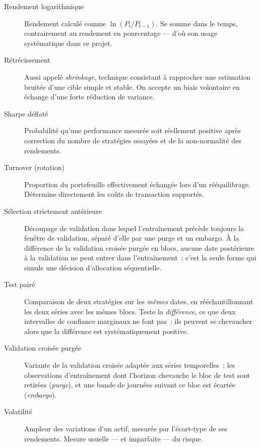 \begin{description}
\item[Rendement logarithmique] Rendement calculé comme $\ln(P_t/P_{t-1})$. Se
somme dans le temps, contrairement au rendement en pourcentage — d'où son usage
systématique dans ce projet.

\item[Rétrécissement] Aussi appelé \emph{shrinkage}, technique consistant à rapprocher une
estimation bruitée d'une cible simple et stable. On accepte un biais volontaire
en échange d'une forte réduction de variance.

\item[Sharpe déflaté] Probabilité qu'une performance mesurée soit réellement
positive après correction du nombre de stratégies essayées et de la
non-normalité des rendements.

\item[Turnover (rotation)] Proportion du portefeuille effectivement échangée lors
d'un rééquilibrage. Détermine directement les coûts de transaction supportés.

\item[Sélection strictement antérieure] Découpage de validation dans lequel
l'entraînement précède toujours la fenêtre de validation, séparé d'elle par une
purge et un embargo. À la différence de la validation croisée purgée en blocs,
aucune date postérieure à la validation ne peut entrer dans l'entraînement~:
c'est la seule forme qui simule une décision d'allocation séquentielle.

\item[Test pairé] Comparaison de deux stratégies sur les \emph{mêmes} dates, en
rééchantillonnant les deux séries avec les mêmes blocs. Teste la
\emph{différence}, ce que deux intervalles de confiance marginaux ne font pas~:
ils peuvent se chevaucher alors que la différence est systématiquement positive.

\item[Validation croisée purgée] Variante de la validation croisée adaptée aux
séries temporelles~: les observations d'entraînement dont l'horizon chevauche le
bloc de test sont retirées (\emph{purge}), et une bande de journées suivant ce
bloc est écartée (\emph{embargo}).

\item[Volatilité] Ampleur des variations d'un actif, mesurée par l'écart-type de
ses rendements. Mesure usuelle — et imparfaite — du risque.

\end{description}

